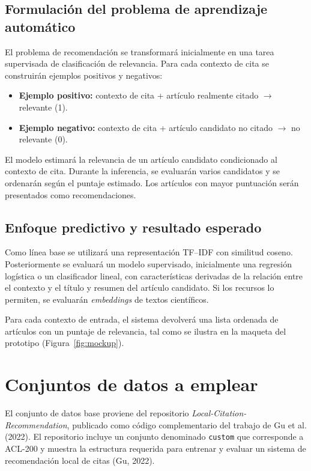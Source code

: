 \documentclass[11pt]{article}
\begin{document}
\subsection{Formulación del problema de aprendizaje automático}

El problema de recomendación se transformará inicialmente en una tarea supervisada de clasificación de relevancia. Para cada contexto de cita se construirán ejemplos positivos y negativos:

\begin{itemize}[leftmargin=1.4em, itemsep=3pt]
  \item \textbf{Ejemplo positivo:} contexto de cita + artículo realmente citado $\rightarrow$ relevante (1).
  \item \textbf{Ejemplo negativo:} contexto de cita + artículo candidato no citado $\rightarrow$ no relevante (0).
\end{itemize}

El modelo estimará la relevancia de un artículo candidato condicionado al contexto de cita. Durante la inferencia, se evaluarán varios candidatos y se ordenarán según el puntaje estimado. Los artículos con mayor puntuación serán presentados como recomendaciones.

\subsection{Enfoque predictivo y resultado esperado}

Como línea base se utilizará una representación TF--IDF con similitud coseno. Posteriormente se evaluará un modelo supervisado, inicialmente una regresión logística o un clasificador lineal, con características derivadas de la relación entre el contexto y el título y resumen del artículo candidato. Si los recursos lo permiten, se evaluarán \textit{embeddings} de textos científicos.

Para cada contexto de entrada, el sistema devolverá una lista ordenada de artículos con un puntaje de relevancia, tal como se ilustra en la maqueta del prototipo (Figura~\ref{fig:mockup}).

\section{Conjuntos de datos a emplear}

El conjunto de datos base proviene del repositorio \textit{Local-Citation-Recommendation}, publicado como código complementario del trabajo de Gu et al. (2022). El repositorio incluye un conjunto denominado \texttt{custom} que corresponde a ACL-200 y muestra la estructura requerida para entrenar y evaluar un sistema de recomendación local de citas (Gu, 2022).
\end{document}
